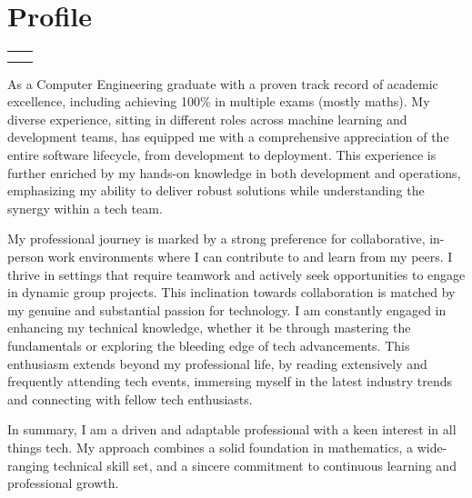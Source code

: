 \documentclass[letterpaper,11pt]{article}
\makeatletter
\newcommand{\resumeSubheading}[4]{
  \vspace{-2pt}\item
    \begin{tabular*}{1.0\textwidth}[t]{l@{\extracolsep{\fill}}r}
      \textbf{#1} & \textbf{\small #2} \\
      \textit{\small#3} & \textit{\small #4} \\
    \end{tabular*}\vspace{-7pt}
}
\newcommand{\resumeSubHeadingListStart}{\begin{itemize}[leftmargin=0.0in, label={}]}
\newcommand{\resumeSubHeadingListEnd}{\end{itemize}}
\makeatother
\begin{document}
\section{Profile}
  \resumeSubHeadingListStart
    \resumeSubheading
      {}{}
      {}{}
      \vspace{-25pt} %
        \small{\item{
         \textbf{}{As a Computer Engineering graduate with a proven track record of academic excellence, including achieving 100\% in multiple exams (mostly maths). My diverse experience, sitting in different roles across machine learning and development teams, has equipped me with a comprehensive appreciation of the entire software lifecycle, from development to deployment. This experience is further enriched by my hands-on knowledge in both development and operations, emphasizing my ability to deliver robust solutions while understanding the synergy within a tech team. \\
      \vspace{4pt} %

        My professional journey is marked by a strong preference for collaborative, in-person work environments where I can contribute to and learn from my peers. I thrive in settings that require teamwork and actively seek opportunities to engage in dynamic group projects. This inclination towards collaboration is matched by my genuine and substantial passion for technology. I am constantly engaged in enhancing my technical knowledge, whether it be through mastering the fundamentals or exploring the bleeding edge of tech advancements. This enthusiasm extends beyond my professional life, by reading extensively and frequently attending tech events, immersing myself in the latest industry trends and connecting with fellow tech enthusiasts. \\
      \vspace{4pt} %
       
        In summary, I am a driven and adaptable professional with a keen interest in all things tech. My approach combines a solid foundation in mathematics, a wide-ranging technical skill set, and a sincere commitment to continuous learning and professional growth.} \\
        }}
     \vspace{-16pt}
  \resumeSubHeadingListEnd
\vspace{5mm}  %
\end{document}
